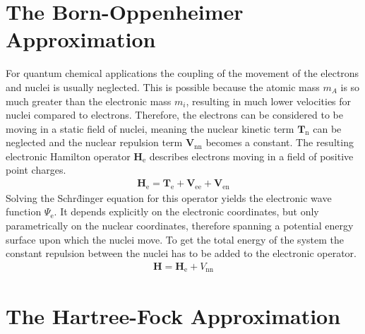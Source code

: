 \section{The Born-Oppenheimer Approximation}
\label{sec:bornoppenheimerapproximation}

For quantum chemical applications the coupling of the movement of the electrons
and nuclei is usually neglected. This is possible because the atomic mass $m_A$
is so much greater than the electronic mass $m_i$, resulting in much lower
velocities for nuclei compared to electrons. Therefore, the electrons can be
considered to be moving in a static field of nuclei, meaning the nuclear kinetic
term $\mathbf{T}_\text{n}$ can be neglected and the nuclear repulsion term
$\mathbf{V}_\text{nn}$ becomes a constant. The resulting electronic Hamilton
operator $\mathbf{H}_\text{e}$ describes electrons moving in a field of
positive point charges.
%
\begin{align}
    \mathbf{H}_\text{e}=\mathbf{T}_\text{e} + \mathbf{V}_\text{ee} + \mathbf{V}_\text{en}
\end{align}
%
Solving the Schr\"dinger equation for this operator yields the electronic wave
function $\Psi_\text{e}$. It depends explicitly on the electronic coordinates,
but only parametrically on the nuclear coordinates, therefore spanning a
potential energy surface upon which the nuclei move. To get the total energy of
the system the constant repulsion between the nuclei has to be added to the
electronic operator. 
%
\begin{align}
    \mathbf{H}=\mathbf{H}_\text{e}+V_\text{nn}\label{eqn:hamiltonoperatorfinal}
\end{align}
%
\section{The Hartree-Fock Approximation}
\label{sec:hartreefockapproximation}

